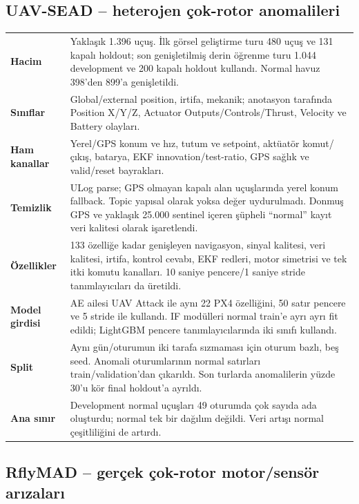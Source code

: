 \documentclass[10pt,a4paper]{article}
\newcommand{\code}[1]{\texttt{\detokenize{#1}}}
\begin{document}
\subsection{UAV-SEAD -- heterojen çok-rotor anomalileri}

\begin{tabularx}{\textwidth}{>{\bfseries}p{}X}
Hacim & Yaklaşık 1.396 uçuş. İlk görsel geliştirme turu 480 uçuş ve 131 kapalı
holdout; son genişletilmiş derin öğrenme turu 1.044 development ve 200 kapalı
holdout kullandı. Normal havuz 398'den 899'a genişletildi. \\
Sınıflar & Global/external position, irtifa, mekanik; anotasyon tarafında Position
X/Y/Z, Actuator Outputs/Controls/Thrust, Velocity ve Battery olayları. \\
Ham kanallar & Yerel/GPS konum ve hız, tutum ve setpoint, aktüatör komut/çıkış,
batarya, EKF innovation/test-ratio, GPS sağlık ve valid/reset bayrakları. \\
Temizlik & ULog parse; GPS olmayan kapalı alan uçuşlarında yerel konum fallback.
Topic yapısal olarak yoksa değer uydurulmadı. Donmuş GPS ve yaklaşık 25.000
\code{eph} sentinel içeren şüpheli ``normal'' kayıt veri kalitesi olarak işaretlendi. \\
Özellikler & 133 özelliğe kadar genişleyen navigasyon, sinyal kalitesi, veri
kalitesi, irtifa, kontrol cevabı, EKF redleri, motor simetrisi ve tek itki komutu
kanalları. 10 saniye pencere/1 saniye stride tanımlayıcıları da üretildi. \\
Model girdisi & AE ailesi UAV Attack ile aynı 22 PX4 özelliğini, 50 satır pencere
ve 5 stride ile kullandı. IF modülleri normal train'e ayrı ayrı fit edildi;
LightGBM pencere tanımlayıcılarında iki sınıfı kullandı. \\
Split & Aynı gün/oturumun iki tarafa sızmaması için oturum bazlı, beş seed.
Anomali oturumlarının normal satırları train/validation'dan çıkarıldı. Son
turlarda anomalilerin yüzde 30'u kör final holdout'a ayrıldı. \\
Ana sınır & Development normal uçuşları 49 oturumda çok sayıda ada oluşturdu;
normal tek bir dağılım değildi. Veri artışı normal çeşitliliğini de artırdı. \\
\end{tabularx}

\subsection{RflyMAD -- gerçek çok-rotor motor/sensör arızaları}
\end{document}
